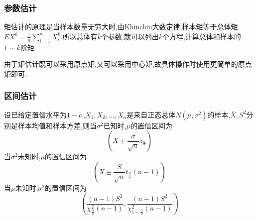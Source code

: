\subsubsection{参数估计}
矩估计的原理是当样本数量无穷大时,由Khinchin大数定律,样本矩等于总体矩$EX^k=\frac{1}{n}\sum_{i=1}^nX_i^k$.所以总体有$k$个参数,就可以列出$k$个方程,计算总体和样本的$1\sim k$阶矩.

由于矩估计既可以采用原点矩,又可以采用中心矩,故具体操作时使用更简单的原点矩即可.

\subsubsection{区间估计}
设已给定置信水平为$1-\alpha$,$X_1,X_2,\dotsc,X_n$是来自正态总体$N(\mu,\sigma^2)$的样本,$\bar{X},S^2$分别是样本均值和样本方差,则当$\sigma^2$已知时,$\mu$的置信区间为
    \begin{equation*}
        \left(\bar{X}\pm \frac{\sigma}{\sqrt{n}}z_{\frac{\alpha}{2}}\right) 
    \end{equation*}
当$\sigma^2$未知时,$\mu$的置信区间为
    \begin{equation*}
        \left(\bar{X}\pm \frac{S}{\sqrt{n}}t_{\frac{\alpha}{2}}(n-1)\right)
    \end{equation*}
当$\mu$未知时,$\sigma^2$的置信区间为
    \begin{equation*}
        \left(\frac{(n-1)S^2}{\chi^2_{\frac{\alpha}{2}}(n-1)},\frac{(n-1)S^2}{\chi^2_{1-\frac{\alpha}{2}}(n-1)}\right) 
    \end{equation*}
